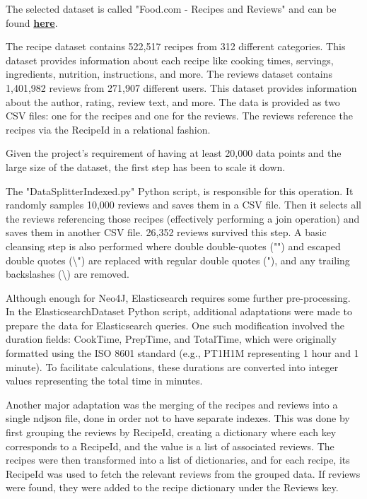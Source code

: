 The selected dataset is called "Food.com - Recipes and Reviews" and can be found \href{https://www.kaggle.com/datasets/irkaal/foodcom-recipes-and-reviews/data}{\textbf{here}}.

The recipe dataset contains 522,517 recipes from 312 different categories. This dataset provides information about each recipe like cooking times, servings, ingredients, nutrition, instructions, and more. The reviews dataset contains 1,401,982 reviews from 271,907 different users. This dataset provides information about the author, rating, review text, and more. The data is provided as two CSV files: one for the recipes and one for the reviews. The reviews reference the recipes via the RecipeId in a relational fashion.

Given the project’s requirement of having at least 20,000 data points and the large size of the dataset, the first step has been to scale it down.

The "DataSplitterIndexed.py" Python script, is responsible for this operation. It randomly samples 10,000 reviews and saves them in a CSV file. Then it selects all the reviews referencing those recipes (effectively performing a join operation) and saves them in another CSV file.
26,352 reviews survived this step. A basic cleansing step is also performed where double double-quotes ("") and escaped double quotes (\textbackslash") are replaced with regular double quotes ("), and any trailing backslashes (\textbackslash) are removed.

Although enough for Neo4J, Elasticsearch requires some further pre-processing.
In the ElasticsearchDataset Python script, additional adaptations were made to prepare the data for Elasticsearch queries. One such modification involved the duration fields: CookTime, PrepTime, and TotalTime, which were originally formatted using the ISO 8601 standard (e.g., PT1H1M representing 1 hour and 1 minute). To facilitate calculations, these durations are converted into integer values representing the total time in minutes.

Another major adaptation was the merging of the recipes and reviews into a single ndjson file, done in order not to have separate indexes. This was done by first grouping the reviews by RecipeId, creating a dictionary where each key corresponds to a RecipeId, and the value is a list of associated reviews. The recipes were then transformed into a list of dictionaries, and for each recipe, its RecipeId was used to fetch the relevant reviews from the grouped data. If reviews were found, they were added to the recipe dictionary under the Reviews key.

